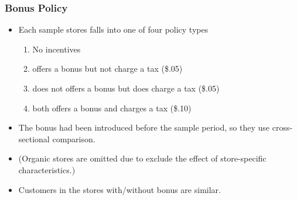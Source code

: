 \documentclass[dvipdfmx,11pt]{beamer}
\begin{document}
\begin{frame}\frametitle{Bonus Policy}
  \begin{itemize}
    \item Each sample stores falls into one of four policy types
    \begin{enumerate}
      \item No incentives
      \item offers a bonus but not charge a tax (\$.05)
      \item does not offers a bonus but does charge a tax (\$.05)
      \item both offers a bonus and charges a tax (\$.10)
    \end{enumerate}
    \item The bonus had been introduced before the sample period, so they use cross-sectional comparison.
    \item (Organic stores are omitted due to exclude the effect of store-specific characteristics.)
    \item Customers in the stores with/without bonus are similar.
  \end{itemize}
\end{frame}
\end{document}
